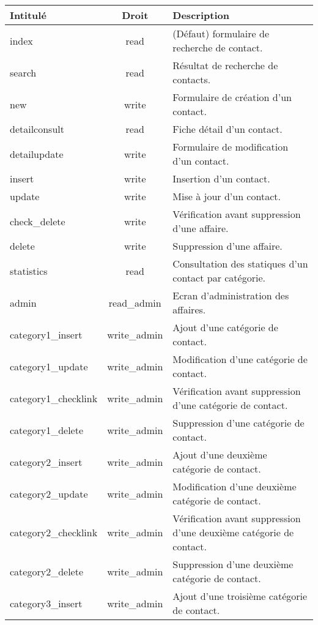 \begin{tabular}{|l|c|p{9.5cm}|}
 \hline
 \textbf{Intitulé} & \textbf{Droit} & \textbf{Description} \\
 \hline
  index & read & (Défaut) formulaire de recherche de contact. \\ 
 \hline
  search & read & Résultat de recherche de contacts. \\
 \hline
  new & write & Formulaire de création d'un contact. \\
 \hline
  detailconsult & read & Fiche détail d'un contact. \\
 \hline
  detailupdate & write & Formulaire de modification d'un contact. \\
 \hline
  insert & write & Insertion d'un contact. \\
 \hline
  update & write & Mise à jour d'un contact. \\
 \hline
  check\_delete & write & Vérification avant suppression d'une affaire. \\
 \hline
  delete & write & Suppression d'une affaire. \\
 \hline
  statistics & read  &   Consultation des statiques d'un contact par catégorie.\\
 \hline
  admin & read\_admin & Ecran d'administration des affaires. \\
 \hline
  category1\_insert & write\_admin & Ajout d'une catégorie de contact. \\
 \hline
  category1\_update & write\_admin & Modification d'une catégorie de contact. \\
 \hline
  category1\_checklink & write\_admin & Vérification avant suppression d'une catégorie de contact. \\
 \hline
  category1\_delete & write\_admin & Suppression d'une catégorie de contact. \\
 \hline
  category2\_insert & write\_admin & Ajout d'une deuxième catégorie de contact. \\
 \hline
  category2\_update & write\_admin & Modification d'une deuxième catégorie de contact. \\
 \hline
  category2\_checklink & write\_admin & Vérification avant suppression d'une deuxième catégorie de contact. \\
 \hline
  category2\_delete & write\_admin & Suppression d'une deuxième catégorie de contact. \\
 \hline
  category3\_insert & write\_admin & Ajout d'une troisième catégorie de contact. \\

\end{tabular}
